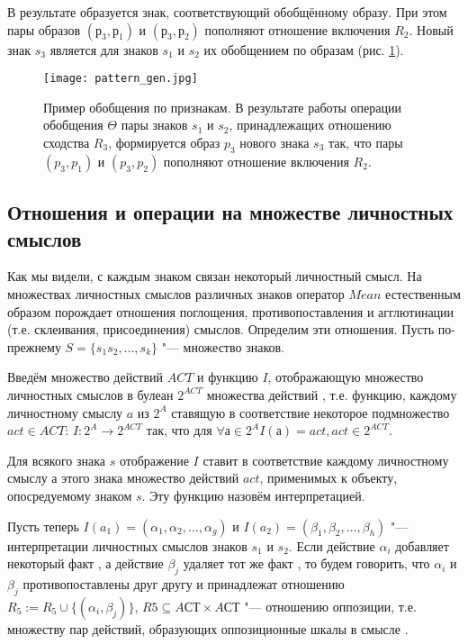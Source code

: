 В результате образуется знак, соответствующий обобщённому образу. При этом пары образов $(р_3,р_1)$ и $(р_3,р_2)$ пополняют отношение включения $R_2$. Новый знак $s_3$ является для знаков $s_1$ и $s_2$ их обобщением по образам (рис. \ref{fg:pattern_gen}).

\begin{figure}[h]
	\centering
	\texttt{[image: pattern\_gen.jpg]}
	\caption{Пример обобщения по признакам. В результате работы операции обобщения $\Theta$ пары знаков $s_1$ и $s_2$, принадлежащих отношению сходства $R_3$, формируется образ $p_3$ нового знака $s_3$ так, что пары $(p_3, p_1)$ и $(p_3, p_2)$ пополняют отношение включения $R_2$.}
	\label{fg:pattern_gen}
\end{figure}

\subsection{Отношения и операции на множестве личностных смыслов}

Как мы видели, с каждым знаком связан некоторый личностный смысл. На множествах личностных смыслов различных знаков оператор $Mean$ естественным образом порождает отношения поглощения, противопоставления и агглютинации (т.е. склеивания, присоединения) смыслов. Определим эти отношения. Пусть по-прежнему $S=\{s_1 s_2,\dots,s_k\}$ "--- множество знаков.

Введём множество действий $ACT$ и функцию $I$, отображающую множество личностных смыслов в булеан $2^{ACT}$ множества действий \cite{Osipov2000}, т.е. функцию, каждому личностному смыслу $a$ из $2^A$ ставящую в соответствие некоторое подмножество $act\in ACT$: $I:2^A\rightarrow 2^{ACT}$ так, что для $\forall а\in 2^A I(а)=act,act\in 2^{ACT}$.

Для всякого знака $s$ отображение $I$ ставит в соответствие каждому личностному смыслу $а$ этого знака множество действий $act$, применимых к объекту, опосредуемому знаком $s$. Эту функцию назовём интерпретацией.

Пусть теперь $I(a_1)=(\alpha_1,\alpha_2,\dots,\alpha_g)$ и $I(a_2)=(\beta_1,\beta_2,\dots,\beta_h)$ "--- интерпретации личностных смыслов знаков $s_1$ и $s_2$. Если действие $\alpha_i$ добавляет некоторый факт \cite{Osipov2000}, а действие $\beta_j$ удаляет тот же факт \cite{Osipov2000}, то будем говорить, что $\alpha_i$ и $\beta_j$ противопоставлены друг другу и принадлежат отношению $R_5:=R_5\cup\{(\alpha_i,\beta_j)\}$, $R5\subseteq AСТ\times AСТ$ "--- отношению оппозиции, т.е. множеству пар действий, образующих оппозиционные шкалы в смысле \cite{Kelly1991}.

